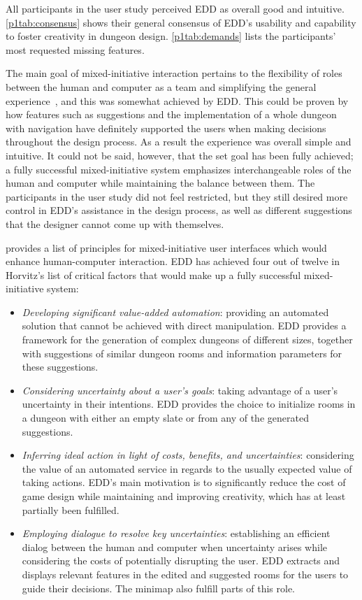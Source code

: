 All participants in the user study perceived EDD as overall good and intuitive. \cref{p1tab:consensus} shows their general consensus of EDD's usability and capability to foster creativity in dungeon design. \cref{p1tab:demands} lists the participants' most requested missing features.

The main goal of mixed-initiative interaction pertains to the flexibility of roles between the human and computer as a team and simplifying the general experience~, and this was somewhat achieved by EDD. This could be proven by how features such as suggestions and the implementation of a whole dungeon with navigation have definitely supported the users when making decisions throughout the design process. As a result the experience was overall simple and intuitive. It could not be said, however, that the set goal has been fully achieved; a fully successful mixed-initiative system emphasizes interchangeable roles of the human and computer while maintaining the balance between them. The participants in the user study did not feel restricted, but they still desired more control in EDD’s assistance in the design process, as well as different suggestions that the designer cannot come up with themselves.

 provides a list of principles for mixed-initiative user interfaces which would enhance human-computer interaction. EDD has achieved four out of twelve in Horvitz’s list of critical factors that would make up a fully successful mixed-initiative system:

\begin{itemize}
\item \textit{Developing significant value-added automation}: providing an automated solution that cannot be achieved with direct manipulation. EDD provides a framework for the generation of complex dungeons of different sizes, together with suggestions of similar dungeon rooms and information parameters for these suggestions. 
\item \textit{Considering uncertainty about a user’s goals}: taking advantage of a user’s uncertainty in their intentions. EDD provides the choice to initialize rooms in a dungeon with either an empty slate or from any of the generated suggestions.
\item \textit{Inferring ideal action in light of costs, benefits, and uncertainties}: considering the value of an automated service in regards to the usually expected value of taking actions. EDD’s main motivation is to significantly reduce the cost of game design while maintaining and improving creativity, which has at least partially been fulfilled.
\item \textit{Employing dialogue to resolve key uncertainties}: establishing an efficient dialog between the human and computer when uncertainty arises while considering the costs of potentially disrupting the user. EDD extracts and displays relevant features in the edited and suggested rooms for the users to guide their decisions. The minimap also fulfill parts of this role.
\end{itemize}

